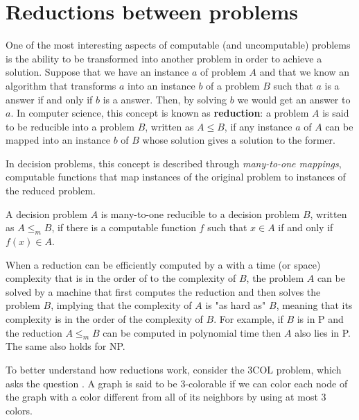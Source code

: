 \newpage

\section{Reductions between problems}

One of the most interesting aspects of computable (and uncomputable) problems is the ability to be transformed into another problem in order to achieve a solution. Suppose that we have an instance $a$ of problem $A$ and that we know an algorithm that transforms $a$ into an instance $b$ of a problem $B$ such that $a$ is a  answer if and only if $b$ is a  answer. Then, by solving $b$ we would get an answer to $a$. In computer science, this concept is known as \textbf{reduction}: a problem $A$ is said to be reducible into a problem $B$, written as $A \leq B$, if any instance $a$ of $A$ can be mapped into an instance $b$ of $B$ whose solution gives a solution to the former.

In decision problems, this concept is described through \textit{many-to-one mappings}, computable functions that map instances of the original problem to instances of the reduced problem.

\begin{definition}
 A decision problem $A$ is many-to-one reducible to a decision problem $B$, written as $A \leq_m B$, if there is a computable function $f$ such that $x \in A$ if and only if $f(x) \in A$. 
\end{definition}

When a reduction can be efficiently computed by a \TM with a time (or space) complexity that is in the order of to the complexity of $B$, the problem $A$ can be solved by a machine that first computes the reduction and then solves the problem $B$, implying that the complexity of $A$ is "as hard as" $B$, meaning that its complexity is in the order of the complexity of $B$. For example, if $B$ is in \textsf{P} and the reduction $A \leq_m B$ can be computed in polynomial time then $A$ also lies in \textsf{P}. The same also holds for \textsf{NP}.

To better understand how reductions work, consider the $3\mathrm{COL}$ problem, which asks the question . A graph is said to be 3-colorable if we can color each node of the graph with a color different from all of its neighbors by using at most 3 colors.

